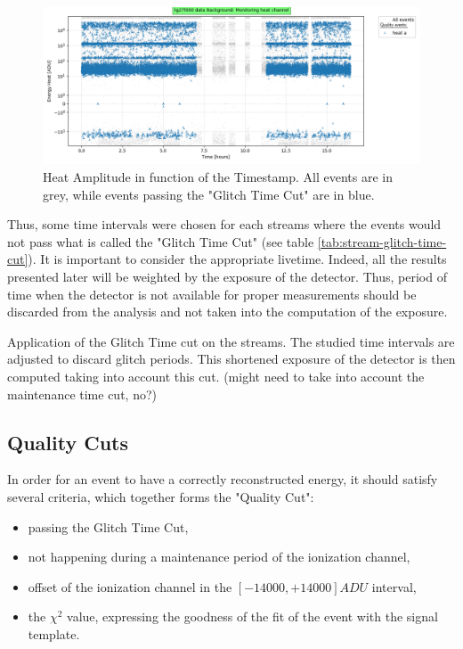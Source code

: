 \begin{figure}
\centering
\includegraphics[width=\linewidth,]{Figures/Neutron/analysis_glitch_cut_demo.png}
\caption{Heat Amplitude in function of the Timestamp. All events are in grey, while events passing the "Glitch Time Cut" are in blue.}
\label{fig:analysis-monitoring-demo}
\end{figure}

Thus, some time intervals were chosen for each streams where the events would not pass what is called the "Glitch Time Cut" (see table \ref{tab:stream-glitch-time-cut}). It is important to consider the appropriate livetime. Indeed, all the results presented later will be weighted by the exposure of the detector. Thus, period of time when the detector is not available for proper measurements should be discarded from the analysis and not taken into the computation of the exposure.

\begin{table}[]
\centering
\resizebox{\linewidth}{!}{
	
}
\caption{Application of the Glitch Time cut on the streams. The studied time intervals are adjusted to discard glitch periods. This shortened exposure of the detector is then computed taking into account this cut. (might need to take into account the maintenance time cut, no?)}
\label{tab:stream-glitch-time-cut}
\end{table}

\subsection{Quality Cuts}
\label{par:quality-cuts}

In order for an event to have a correctly reconstructed energy, it should satisfy several criteria, which together forms the "Quality Cut":
\begin{itemize}
	\item passing the Glitch Time Cut,
	\item not happening during a maintenance period of the ionization channel,
	\item offset of the ionization channel in the $[-14000, +14000] ADU$ interval,
	\item the $\chi^2$ value, expressing the goodness of the fit of the event with the signal template.
\end{itemize}

